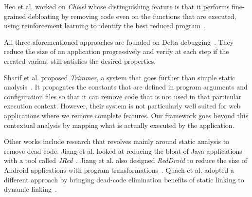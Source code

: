 Heo et al. worked on \textit{Chisel} whose distinguishing feature is that it performs fine-grained debloating by removing code even on the functions that are executed, using reinforcement learning to identify the best reduced program~\cite{heo2018effective}.

All three aforementioned approaches are founded on Delta debugging~\cite{zeller2002Delta}.
They reduce the size of an application progressively and verify at each step if the created variant still satisfies the desired properties.


Sharif et al. proposed \textit{Trimmer}, a system that goes further than simple static analysis~\cite{sharif2018Trimmer}.
It propagates the constants that are defined in program arguments and configuration files so that it can remove code that is not used in that particular execution context.
However, their system is not particularly well suited for web applications where we remove complete features.
Our framework goes beyond this contextual analysis by mapping what is actually executed by the application.

Other works include research that revolves mainly around static analysis to remove dead code.
Jiang et al. looked at reducing the bloat of Java applications with a tool called \textit{JRed}~\cite{jiang2016Jred}.
Jiang et al. also designed \textit{RedDroid} to reduce the size of Android applications with program transformations~\cite{jiang2018reddroid}.
Quach et al. adopted a different approach by bringing dead-code elimination benefits of static linking to dynamic linking~\cite{quach2018debloating}.

